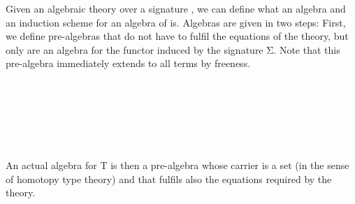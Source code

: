 \documentclass{easychair}
\begin{document}
Given an algebraic theory
 \ofT {}
over a signature , we can define what an algebra and an induction
scheme for an algebra of  is.
Algebras are given in two steps: First, we define pre-algebras that do not have
to fulfil the equations of the theory, but only are an algebra for the functor
induced by the signature Σ.
Note that this pre-algebra immediately extends to all terms by freeness.
\begin{code}%
\>[0][@{}l@{\AgdaIndent{1}}]%
\>[2]\AgdaSpace{}%
\AgdaSpace{}%
\AgdaSymbol{:}\AgdaSpace{}%
\UO
{}\AgdaSpace{}%
\<%
\\
\>[2][@{}l@{\AgdaIndent{0}}]%
\>[4][@{}l@{\AgdaIndent{0}}]%
\>[6]%
\>[19]\AgdaSymbol{:}\AgdaSpace{}%
\UZ\AgdaSpace{}%
\<%
\\
%
\>[6]%
\>[15]\AgdaSymbol{:}\AgdaSpace{}%
\AgdaSymbol{(}\AgdaSpace{}%
\AgdaSymbol{:}\AgdaSpace{}%
\AgdaSpace{}\AgdaSymbol{)}\AgdaSpace{}%
\AgdaSymbol{(}\AgdaSpace{}%
\AgdaSymbol{:}\AgdaSpace{}%
\AgdaSpace{}%
\AgdaSpace{}%
\AgdaSpace{}%
\AgdaSpace{}%
\AgdaSymbol{)}\AgdaSpace{}%
\AgdaSpace{}%
\<%
\\
%
\\[\AgdaEmptyExtraSkip]%
%
\>[4]\AgdaSpace{}%
\AgdaSymbol{:}\AgdaSpace{}%
\AgdaSpace{}%
\AgdaSpace{}%
\AgdaSpace{}%
\AgdaSpace{}%
\<%
\\
%
\>[4]\AgdaSpace{}%
\AgdaSymbol{=}\AgdaSpace{}%
\AgdaSpace{}%
\AgdaSpace{}%
\AgdaSpace{}%
\AgdaSpace{}%
\AgdaSymbol{)}\AgdaSpace{}%
\<%
\end{code}
An actual algebra for T is then a pre-algebra whose carrier is a set (in the
sense of homotopy type theory) and that fulfils also the equations required by
the theory.
\end{document}
